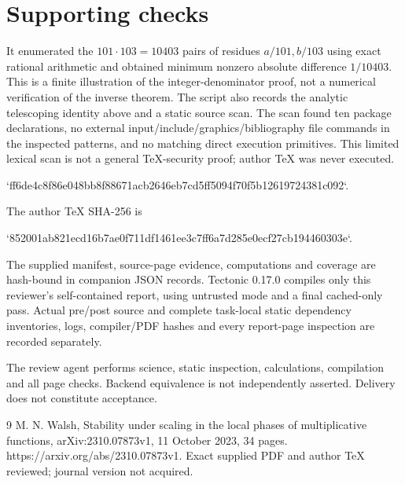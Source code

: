 \documentclass[10pt]{article}
\begin{document}
\section*{Supporting checks}
It enumerated the \(101\cdot103=10403\) pairs of residues \(a/101,b/103\) using exact rational arithmetic and obtained minimum nonzero absolute difference \(1/10403\). This is a finite illustration of the integer-denominator proof, not a numerical verification of the inverse theorem. The script also records the analytic telescoping identity above and a static source scan. The scan found ten package declarations, no external input/include/graphics/bibliography file commands in the inspected patterns, and no matching direct execution primitives. This limited lexical scan is not a general TeX-security proof; author TeX was never executed.\par
`ff6de4c8f86e048bb8f88671acb2646eb7cd5ff5094f70f5b12619724381c092`.\par
The author TeX SHA-256 is\par
`852001ab821ecd16b7ae0f711df1461ee3c7ff6a7d285e0ecf27cb194460303e`.\par
The supplied manifest, source-page evidence, computations and coverage are hash-bound in companion JSON records. Tectonic 0.17.0 compiles only this reviewer’s self-contained report, using untrusted mode and a final cached-only pass. Actual pre/post source and complete task-local static dependency inventories, logs, compiler/PDF hashes and every report-page inspection are recorded separately.\par
The review agent performs science, static inspection, calculations, compilation and all page checks. Backend equivalence is not independently asserted. Delivery does not constitute acceptance.\par
9 M. N. Walsh, Stability under scaling in the local phases of multiplicative functions, arXiv:2310.07873v1, 11 October 2023, 34 pages. https://arxiv.org/abs/2310.07873v1. Exact supplied PDF and author TeX reviewed; journal version not acquired.\par
\end{document}
